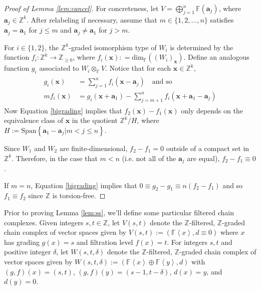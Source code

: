 \documentclass[11pt]{article}
\theoremstyle{plain} \newtheorem{thm}{Theorem}[subsection]
\theoremstyle{plain} \newtheorem{cor}[thm]{Corollary}
\theoremstyle{plain} \newtheorem{prop}[thm]{Proposition}
\theoremstyle{plain} \newtheorem{conj}[thm]{Conjecture}
\theoremstyle{plain} \newtheorem{lem}[thm]{Lemma}
\theoremstyle{definition} \newtheorem{df}[thm]{Definition}
\theoremstyle{remark} \newtheorem{rmk}[thm]{Remark}
\theoremstyle{remark} \newtheorem{obs}[thm]{Observation}
\newcommand{\bx}{\mathbf{x}}
\newcommand{\F}[1]{\mathbb{F}\left< #1 \right>}
\newcommand{\bda}{\boldsymbol{a}}
\numberwithin{equation}{section}
\begin{document}
\begin{proof}[Proof of Lemma \ref{lem:cancel}]
For concreteness, let $V = \displaystyle \bigoplus_{j = 1}^{n} \mathbb{F} \left( \bda_j \right)$, where $\bda_j \in \mathbb{Z}^k$.  After relabeling if necessary, assume that $m \in \{ 1, 2, \ldots, n \}$ satisfies $\bda_j = \bda_1$ for $j \leq m$ and $\bda_{j} \neq \bda_1$ for $j > m$.

For $i \in \{ 1,2 \}$, the $\mathbb{Z}^k$-graded isomorphism type of $W_i$ is determined by the function $f_i:\mathbb{Z}^k \rightarrow \mathbb{Z}_{\geq 0}$, where $f_i(\bx): = \text{dim}_{\mathbb{F}}\left( \left( W_i\right)_{\bx} \right)$.  Define an analogous function $g_i$ associated to $W_i \otimes_{\mathbb{F}} V$.  Notice that for each $\bx \in \mathbb{Z}^k$,
\begin{gather}\label{bigrading}
\begin{aligned}
g_i(\bx) &= \sum_{j = 1}^n f_i(\bx - \bda_j) \quad \text{and so}\\
mf_i(\bx) &= g_i(\bx + \bda_1) - \sum_{j = m+1}^{n} f_i\left( \bx + \bda_1 - \bda_j \right)
\end{aligned}
\end{gather}
Now Equation \ref{bigrading} implies that $f_2(\bx)- f_1(\bx)$ only depends on the equivalence class of $\bx$ in the quotient $\mathbb{Z}^k/H$, where $H:= \text{Span} \left\{ \bda_{1} - \bda_{j} | m < j \leq n  \right\}$.

Since $W_1$ and $W_2$ are finite-dimensional, $f_2 - f_1 = 0$ outside of a compact set in $\mathbb{Z}^k$.  Therefore, in the case that $m < n$ (i.e. not all of the $\bda_j$ are equal), $f_2 - f_1 \equiv 0$.

If $m = n$, Equation \ref{bigrading} implies that $0 \equiv g_2 - g_1 \equiv n(f_2 - f_1)$ and so $f_1 \equiv f_2$ since $\mathbb{Z}$ is torsion-free.
\end{proof}

Prior to proving Lemma \ref{lem:ss}, we'll define some particular filtered chain complexes.  Given integers $s,t \in \mathbb{Z}$, let $V(s,t)$ denote the $\mathbb{Z}$-filtered, $\mathbb{Z}$-graded chain complex of vector spaces given by $V(s,t) := \left(\F{x} , d \equiv 0 \right)$ where $x$ has grading $g(x) = s$ and filtration level $f(x) = t$.  For integers $s,t$ and positive integer $\delta$, let $W(s,t,\delta)$ denote the $\mathbb{Z}$-filtered, $\mathbb{Z}$-graded chain complex of vector spaces given by $ W(s,t,\delta) := \left( \F{x} \oplus \F{y}, d \right)$ with $(g,f)(x) = (s,t)$, $(g,f)(y) = (s-1,t-\delta)$, $d(x) = y$, and $d(y)=0$.
\end{document}

